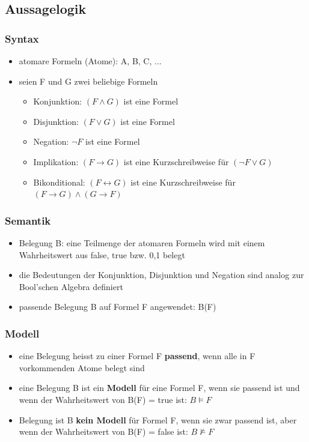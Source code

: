 \documentclass[a4paper,10pt]{article}
\newcommand{\Bold}[1]{\textbf{#1}} %
\newcommand{\ra}{\rightarrow}
\begin{document}
\subsection{Aussagelogik}
\subsubsection{Syntax}
		\begin{itemize}
			\item atomare Formeln (Atome): A, B, C, ...
			\item seien F und G zwei beliebige Formeln
				\begin{itemize}
					\item Konjunktion: $(F \wedge G)$ ist eine Formel
					\item Disjunktion: $(F \vee G)$ ist eine Formel
					\item Negation: $\neg F$ ist eine Formel
					\item Implikation: $(F \rightarrow G)$ ist eine Kurzschreibweise f\"ur $(\neg F \vee G)$
					\item Bikonditional: $(F \leftrightarrow G)$ ist eine Kurzschreibweise f\"ur $(F \ra G) \wedge (G \ra F)$
				\end{itemize}
		\end{itemize}
		
\subsubsection{Semantik}
		\begin{itemize}
				\item Belegung B: eine Teilmenge der atomaren Formeln wird mit einem Wahrheitswert aus {false, true} bzw. {0,1} belegt
				\item die Bedeutungen der Konjunktion, Disjunktion und Negation sind analog zur Bool'schen Algebra definiert
				\item passende Belegung B auf Formel F angewendet: B(F)
		\end{itemize}
		
\subsubsection{Modell}
		\begin{itemize}
			\item eine Belegung heisst zu einer Formel F \Bold {passend}, wenn alle in F
vorkommenden Atome belegt sind
			\item eine Belegung B ist ein \Bold {Modell} f\"ur eine Formel F, wenn sie passend ist
und wenn der Wahrheitswert von B(F) = true ist: $B \models F$
			\item Belegung ist B \Bold {kein Modell} f\"ur Formel F, wenn sie zwar passend ist,
aber wenn der Wahrheitswert von B(F) = false ist: $B \nvDash F$
		\end{itemize}
		
\end{document}
